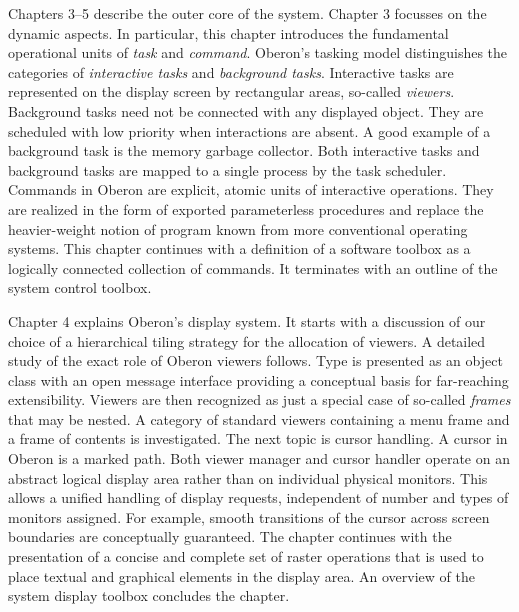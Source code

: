 Chapters 3--5 describe the outer core of the system. Chapter 3
focusses on the dynamic aspects. In particular, this chapter
introduces the fundamental operational units of \emph{task} and
\emph{command}. Oberon's tasking model distinguishes the categories of
\emph{interactive tasks} and \emph{background tasks}. Interactive tasks are
represented on the display screen by rectangular areas, so-called
\emph{viewers}. Background tasks need not be connected with any displayed
object. They are scheduled with low priority when interactions are
absent. A good example of a background task is the memory garbage
collector. Both interactive tasks and background tasks are mapped to a
single process by the task scheduler. Commands in Oberon are explicit,
atomic units of interactive operations. They are realized in the form
of exported parameterless procedures and replace the heavier-weight
notion of program known from more conventional operating systems. This
chapter continues with a definition of a software toolbox as a
logically connected collection of commands. It terminates with an
outline of the system control toolbox.


Chapter 4 explains Oberon's display system. It starts with a
discussion of our choice of a hierarchical tiling strategy for the
allocation of viewers. A detailed study of the exact role of Oberon
viewers follows. Type  is presented as an object class
with an open message interface providing a conceptual basis for far-reaching
extensibility. Viewers are then recognized as just a special case of
so-called \emph{frames} that may be nested. A category of standard viewers
containing a menu frame and a frame of contents is investigated. The
next topic is cursor handling. A cursor in Oberon is a marked
path. Both viewer manager and cursor handler operate on an abstract
logical display area rather than on individual physical monitors. This
allows a unified handling of display requests, independent of number
and types of monitors assigned. For example, smooth transitions of the
cursor across screen boundaries are conceptually guaranteed. The
chapter continues with the presentation of a concise and complete set
of raster operations that is used to place textual and graphical
elements in the display area. An overview of the system display
toolbox concludes the chapter.

